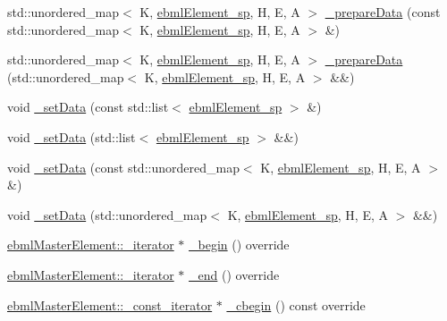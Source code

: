 \begin{DoxyCompactItemize}
\item 
std\+::unordered\+\_\+map$<$ K, \mbox{\hyperlink{namespaceebml_adad533b7705a16bb360fe56380c5e7be}{ebml\+Element\+\_\+sp}}, H, E, A $>$ \mbox{\hyperlink{classebml_1_1ebmlMap_a5321d1ef4be520aaee8cf6428686314b}{\+\_\+prepare\+Data}} (const std\+::unordered\+\_\+map$<$ K, \mbox{\hyperlink{namespaceebml_adad533b7705a16bb360fe56380c5e7be}{ebml\+Element\+\_\+sp}}, H, E, A $>$ \&)
\item 
std\+::unordered\+\_\+map$<$ K, \mbox{\hyperlink{namespaceebml_adad533b7705a16bb360fe56380c5e7be}{ebml\+Element\+\_\+sp}}, H, E, A $>$ \mbox{\hyperlink{classebml_1_1ebmlMap_a4b1173caaeed4fc75e729a7bae6d3390}{\+\_\+prepare\+Data}} (std\+::unordered\+\_\+map$<$ K, \mbox{\hyperlink{namespaceebml_adad533b7705a16bb360fe56380c5e7be}{ebml\+Element\+\_\+sp}}, H, E, A $>$ \&\&)
\item 
void \mbox{\hyperlink{classebml_1_1ebmlMap_af49238b045b083e8c47d223ec5eaffd2}{\+\_\+set\+Data}} (const std\+::list$<$ \mbox{\hyperlink{namespaceebml_adad533b7705a16bb360fe56380c5e7be}{ebml\+Element\+\_\+sp}} $>$ \&)
\item 
void \mbox{\hyperlink{classebml_1_1ebmlMap_a9779497bcff6f45ae7081e319155376b}{\+\_\+set\+Data}} (std\+::list$<$ \mbox{\hyperlink{namespaceebml_adad533b7705a16bb360fe56380c5e7be}{ebml\+Element\+\_\+sp}} $>$ \&\&)
\item 
void \mbox{\hyperlink{classebml_1_1ebmlMap_a881bfc53cc7f774c9a3aaf79ee6c9e9b}{\+\_\+set\+Data}} (const std\+::unordered\+\_\+map$<$ K, \mbox{\hyperlink{namespaceebml_adad533b7705a16bb360fe56380c5e7be}{ebml\+Element\+\_\+sp}}, H, E, A $>$ \&)
\item 
void \mbox{\hyperlink{classebml_1_1ebmlMap_a0b394fd2545a526334ab909fdb07b1bd}{\+\_\+set\+Data}} (std\+::unordered\+\_\+map$<$ K, \mbox{\hyperlink{namespaceebml_adad533b7705a16bb360fe56380c5e7be}{ebml\+Element\+\_\+sp}}, H, E, A $>$ \&\&)
\item 
\mbox{\hyperlink{classebml_1_1ebmlMasterElement_1_1__iterator}{ebml\+Master\+Element\+::\+\_\+iterator}} $\ast$ \mbox{\hyperlink{classebml_1_1ebmlMap_a1e395f6d3d365562e5bebc37b3cba8ef}{\+\_\+begin}} () override
\item 
\mbox{\hyperlink{classebml_1_1ebmlMasterElement_1_1__iterator}{ebml\+Master\+Element\+::\+\_\+iterator}} $\ast$ \mbox{\hyperlink{classebml_1_1ebmlMap_a8b6a25187190a26a7988d4bbaf853d78}{\+\_\+end}} () override
\item 
\mbox{\hyperlink{classebml_1_1ebmlMasterElement_1_1__const__iterator}{ebml\+Master\+Element\+::\+\_\+const\+\_\+iterator}} $\ast$ \mbox{\hyperlink{classebml_1_1ebmlMap_aa2f09d5ea0bf736dc32a4f04732fd4ba}{\+\_\+cbegin}} () const override

\end{DoxyCompactItemize}
